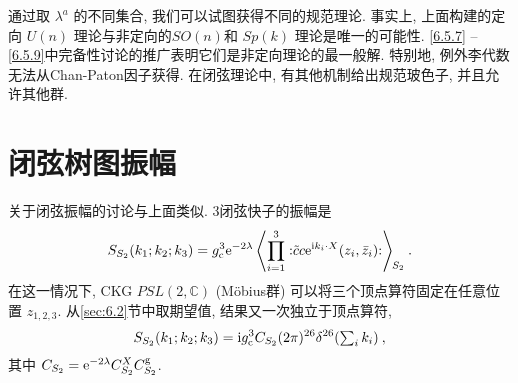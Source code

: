 通过取 $\lambda^{a} $ 的不同集合, 我们可以试图获得不同的规范理论. 事实上, 上面构建的定向 $U(n)$ 理论与非定向的$S O(n)$和 $S p(k)$ 理论是唯一的可能性. 
\eqref{6.5.7} -- \eqref{6.5.9}中完备性讨论的推广表明它们是非定向理论的最一般解. 特别地, 例外李代数无法从Chan-Paton因子获得. 
在闭弦理论中, 有其他机制给出规范玻色子, 并且允许其他群.

\section{闭弦树图振幅} \label{sec:6.6}%

关于闭弦振幅的讨论与上面类似. 3闭弦快子的振幅是
\begin{equation}
	S_{S_{2}}(k_{1} ; k_{2} ; k_{3})=g_{\mathrm{c}}^{3} \mathrm{e}^{-2 \lambda}\left\langle\prod_{i=1}^{3} 
	: \mathrel{\tilde{c} c \mathrm{e}^{\mathrm{i} k_{i} \cdot X}(z_{i}, \bar{z}_{i})}:\right\rangle \bigg._{\!\!S_{2}} \:. \label{6.6.1}
\end{equation}
在这一情况下, CKG $PSL(2, \mathds{C})$ (M\"{o}bius群) 可以将三个顶点算符固定在任意位置 $z_{1,2,3}$. 从\ref{sec:6.2}节中取期望值, 
结果又一次独立于顶点算符,
\begin{equation}
	S_{S_{2}}(k_{1} ; k_{2} ; k_{3})= \mathrm{i} g_{\mathrm{c}}^{3} C_{S_{2}}(2 \pi)^{26} \delta^{26}({\textstyle \sum_{i} k_{i}}) \:, 
	\label{6.6.2}
\end{equation}
其中 $C_{S_{2}}=\mathrm{e}^{-2 \lambda} C_{S_{2}}^{X} C_{S_{2}}^{\mathrm{g}}$.

